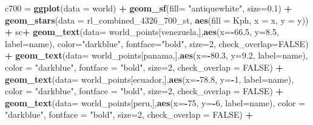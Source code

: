 \documentclass[12pt,oneside]{reedthesis}
\newenvironment{Shaded}{\begin{snugshade}}{\end{snugshade}}
\newcommand{\DataTypeTok}[1]{\textcolor[rgb]{0.13,0.29,0.53}{#1}}
\newcommand{\DecValTok}[1]{\textcolor[rgb]{0.00,0.00,0.81}{#1}}
\newcommand{\FloatTok}[1]{\textcolor[rgb]{0.00,0.00,0.81}{#1}}
\newcommand{\KeywordTok}[1]{\textcolor[rgb]{0.13,0.29,0.53}{\textbf{#1}}}
\newcommand{\NormalTok}[1]{#1}
\newcommand{\OperatorTok}[1]{\textcolor[rgb]{0.81,0.36,0.00}{\textbf{#1}}}
\newcommand{\OtherTok}[1]{\textcolor[rgb]{0.56,0.35,0.01}{#1}}
\newcommand{\StringTok}[1]{\textcolor[rgb]{0.31,0.60,0.02}{#1}}
\begin{document}
\begin{Shaded}
\begin{Highlighting}[]
\NormalTok{c700 =}\StringTok{ }\KeywordTok{ggplot}\NormalTok{(}\DataTypeTok{data =}\NormalTok{ world) }\OperatorTok{+}\StringTok{ }
\StringTok{  }\KeywordTok{geom_sf}\NormalTok{(}\DataTypeTok{fill=} \StringTok{"antiquewhite"}\NormalTok{, }\DataTypeTok{size=}\FloatTok{0.1}\NormalTok{) }\OperatorTok{+}\StringTok{ }
\StringTok{  }\KeywordTok{geom_stars}\NormalTok{(}\DataTypeTok{data =}\NormalTok{ rl_combined_}\DecValTok{4326}\NormalTok{_}\DecValTok{700}\NormalTok{_st, }\KeywordTok{aes}\NormalTok{(}\DataTypeTok{fill =}\NormalTok{ Kph, }\DataTypeTok{x =}\NormalTok{ x, }\DataTypeTok{y =}\NormalTok{ y)) }\OperatorTok{+}\StringTok{ }
\StringTok{  }\NormalTok{sc}\OperatorTok{+}
\StringTok{  }\KeywordTok{geom_text}\NormalTok{(}\DataTypeTok{data=}\NormalTok{ world_points[venezuela,],}\KeywordTok{aes}\NormalTok{(}\DataTypeTok{x=}\OperatorTok{-}\FloatTok{66.5}\NormalTok{, }\DataTypeTok{y=}\FloatTok{8.5}\NormalTok{, }\DataTypeTok{label=}\NormalTok{name), }\DataTypeTok{color=}\StringTok{"darkblue"}\NormalTok{, }\DataTypeTok{fontface=}\StringTok{"bold"}\NormalTok{, }\DataTypeTok{size=}\DecValTok{2}\NormalTok{, }\DataTypeTok{check_overlap=}\OtherTok{FALSE}\NormalTok{) }\OperatorTok{+}
\StringTok{  }\KeywordTok{geom_text}\NormalTok{(}\DataTypeTok{data=}\NormalTok{ world_points[panama,],}\KeywordTok{aes}\NormalTok{(}\DataTypeTok{x=}\OperatorTok{-}\FloatTok{80.3}\NormalTok{, }\DataTypeTok{y=}\FloatTok{9.2}\NormalTok{, }\DataTypeTok{label=}\NormalTok{name), }\DataTypeTok{color =} \StringTok{"darkblue"}\NormalTok{, }\DataTypeTok{fontface =} \StringTok{"bold"}\NormalTok{, }\DataTypeTok{size=}\DecValTok{2}\NormalTok{, }\DataTypeTok{check_overlap =} \OtherTok{FALSE}\NormalTok{) }\OperatorTok{+}\StringTok{ }
\StringTok{  }\KeywordTok{geom_text}\NormalTok{(}\DataTypeTok{data=}\NormalTok{ world_points[ecuador,],}\KeywordTok{aes}\NormalTok{(}\DataTypeTok{x=}\OperatorTok{-}\FloatTok{78.8}\NormalTok{, }\DataTypeTok{y=}\OperatorTok{-}\DecValTok{1}\NormalTok{, }\DataTypeTok{label=}\NormalTok{name), }\DataTypeTok{color =} \StringTok{"darkblue"}\NormalTok{, }\DataTypeTok{fontface =} \StringTok{"bold"}\NormalTok{, }\DataTypeTok{size=}\DecValTok{2}\NormalTok{, }\DataTypeTok{check_overlap =} \OtherTok{FALSE}\NormalTok{) }\OperatorTok{+}
\StringTok{  }\KeywordTok{geom_text}\NormalTok{(}\DataTypeTok{data=}\NormalTok{ world_points[peru,],}\KeywordTok{aes}\NormalTok{(}\DataTypeTok{x=}\OperatorTok{-}\DecValTok{75}\NormalTok{, }\DataTypeTok{y=}\OperatorTok{-}\DecValTok{6}\NormalTok{, }\DataTypeTok{label=}\NormalTok{name), }\DataTypeTok{color =} \StringTok{"darkblue"}\NormalTok{, }\DataTypeTok{fontface =} \StringTok{"bold"}\NormalTok{, }\DataTypeTok{size=}\DecValTok{2}\NormalTok{, }\DataTypeTok{check_overlap =} \OtherTok{FALSE}\NormalTok{) }\OperatorTok{+}

\end{Highlighting}
\end{Shaded}
\end{document}
